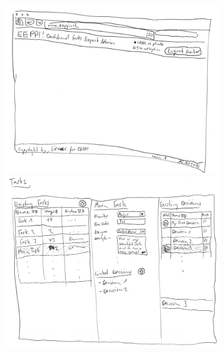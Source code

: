 	\begin{figure}[H]
		\begin{minipage}[b]{0.5\linewidth}
			\includegraphics[width=\linewidth]{interfacesAndProtocols/media/img/wireframesLaurin1.jpg}
		\end{minipage}
		\begin{minipage}[b]{0.5\linewidth}	
			\includegraphics[width=\linewidth]{interfacesAndProtocols/media/img/wireframesLaurin2.jpg}
		\end{minipage}
	\end{figure}
	

